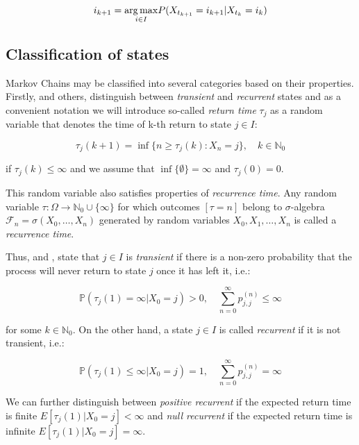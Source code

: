 \begin{equation}
 i_{k+1} = \underset{i \in I}{\arg\max} P(X_{t_{k+1}}=i_{k+1}|X_{t_{k}}=i_{k}) \\
\end{equation} 

\subsection{Classification of states}

Markov Chains may be classified into several categories based on their properties. 
Firstly, \citep{Praskova2012} and others, distinguish between \textit{transient} and \textit{recurrent} states and as a convenient notation we will introduce so-called \textit{return time} $\tau_j$ 
as a random variable that denotes the time of k-th return to state $j \in I$:

\begin{equation}
\tau_j(k+1) = \inf \{n \geq \tau_j(k) : X_n =j\}, \quad k \in \mathbb{N}_0
\end{equation}

if $\tau_j(k) \leq \infty$ and we assume that $\inf\{\emptyset\} = \infty$ and $\tau_j(0) = 0$.

This random variable also satisfies properties of {\it recurrence time}. 
Any random variable $\tau:\Omega \to \mathbb{N}_0 \cup \{ \infty \}$ for which outcomes $[\tau = n]$ belong to 
$\sigma$-algebra $\mathcal{F}_n = \sigma(X_0,\ldots,X_n)$ generated by random variables $X_0,X_1, \ldots , X_n$ is called a {\it recurrence time}.

Thus, \citep{Bremaud1999} and \citep{Tolver2016}, state that $j \in I$ is \textit{transient} if there is a non-zero probability that the process will never return to state $j$ once it has left it, i.e.:

\begin{equation}
    \mathbb{P}(\tau_j(1) = \infty|X_0=j) > 0, \quad \sum\limits_{n=0}^{\infty} p_{j,j}^{(n)} \leq \infty
\end{equation}

for some $k \in \mathbb{N}_0$. On the other hand, a state $j \in I$ is called {\it recurrent} if it is not transient, i.e.:

\begin{equation}
    \mathbb{P}(\tau_j(1) \leq \infty|X_0=j) = 1, \quad \sum\limits_{n=0}^{\infty} p_{j,j}^{(n)} = \infty
\end{equation}

We can further distinguish between {\it positive recurrent} if the expected return time is finite $E[\tau_j(1)|X_0=j] < \infty$ and {\it null recurrent} if the expected return time is infinite $E[\tau_j(1)|X_0=j] = \infty$.

